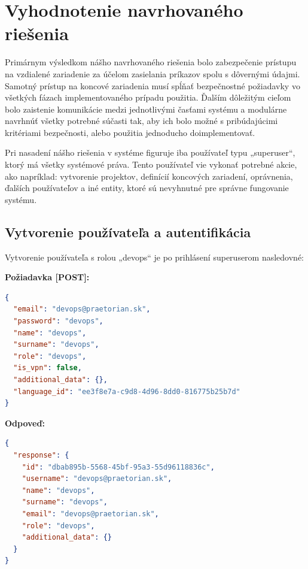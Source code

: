 \chapter{Vyhodnotenie navrhovaného riešenia}\label{ch:vyhodnotenie-navrhovaneho-riesenia}

Primárnym výsledkom nášho navrhovaného riešenia bolo zabezpečenie prístupu na vzdialené zariadenie za účelom zasielania príkazov
spolu s dôvernými údajmi.
Samotný prístup na koncové zariadenia musí spĺňať bezpečnostné požiadavky vo všetkých fázach implementovaného prípadu
použitia.
Ďalším dôležitým cieľom bolo zaistenie komunikácie medzi jednotlivými časťami systému a modulárne navrhnúť všetky potrebné
súčasti tak, aby ich bolo možné s pribúdajúcimi kritériami bezpečnosti, alebo použitia jednoducho doimplementovať.

Pri nasadení nášho riešenia v systéme figuruje iba používateľ typu „superuser“, ktorý má všetky systémové práva.
Tento používateľ vie vykonať potrebné akcie, ako napríklad: vytvorenie projektov, definícií koncových zariadení, oprávnenia,
ďalších používateľov a iné entity, ktoré sú nevyhnutné pre správne fungovanie systému.

\section{Vytvorenie používateľa a autentifikácia}\label{sec:vytvorenie-pouzivatela-autentifikacia}

Vytvorenie používateľa s rolou „devops“ je po prihlásení superuserom nasledovné:

\textbf{\large Požiadavka [POST]:}

\begin{lstlisting}[language=json,firstnumber=1]
{
  "email": "devops@praetorian.sk",
  "password": "devops",
  "name": "devops",
  "surname": "devops",
  "role": "devops",
  "is_vpn": false,
  "additional_data": {},
  "language_id": "ee3f8e7a-c9d8-4d96-8dd0-816775b25b7d"
}
\end{lstlisting}

\textbf{\large Odpoveď:}

\begin{lstlisting}[language=json,firstnumber=1]
{
  "response": {
    "id": "dbab895b-5568-45bf-95a3-55d96118836c",
    "username": "devops@praetorian.sk",
    "name": "devops",
    "surname": "devops",
    "email": "devops@praetorian.sk",
    "role": "devops",
    "additional_data": {}
  }
}
\end{lstlisting}

